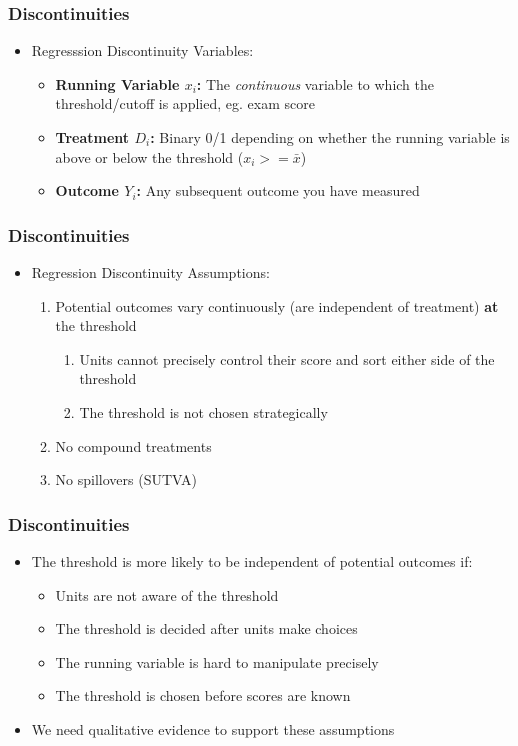 \documentclass[xcolor=x11names,compress]{beamer}\usepackage[]{graphicx}\usepackage[]{color}
\renewcommand{\(}{\begin{columns}}
\renewcommand{\)}{\end{columns}}
\newcommand{\<}[1]{\begin{column}{#1}}
\renewcommand{\>}{\end{column}}
\begin{document}
\begin{frame}
\frametitle{Discontinuities}
\begin{itemize}
\item Regresssion Discontinuity Variables:
\begin{itemize}
\item \textbf{Running Variable $x_i$:} The \textit{continuous} variable to which the threshold/cutoff is applied, eg. exam score
\pause
\item \textbf{Treatment $D_i$:} Binary 0/1 depending on whether the running variable is above or below the threshold ($x_i>=\bar{x}$)
\pause
\item \textbf{Outcome $Y_i$:} Any subsequent outcome you have measured
\end{itemize}
\end{itemize}
\end{frame}

\begin{frame}
\frametitle{Discontinuities}
\begin{itemize}
\item Regression Discontinuity Assumptions:
\begin{enumerate}
\item Potential outcomes vary continuously (are independent of treatment) \textbf{at} the threshold
\begin{enumerate}
\pause
\item Units cannot precisely control their score and sort either side of the threshold
\pause
\item The threshold is not chosen strategically
\end{enumerate}
\pause
\item No compound treatments
\pause
\item No spillovers (SUTVA)
\end{enumerate}
\end{itemize}
\end{frame}

\begin{frame}
\frametitle{Discontinuities}
\begin{itemize}
\item The threshold is more likely to be independent of potential outcomes if:
\pause
\begin{itemize}
\item Units are not aware of the threshold
\pause
\item The threshold is decided after units make choices
\pause
\item The running variable is hard to manipulate precisely
\pause
\item The threshold is chosen before scores are known
\pause
\end{itemize}
\item We need qualitative evidence to support these assumptions
\end{itemize}
\end{frame}
\end{document}
